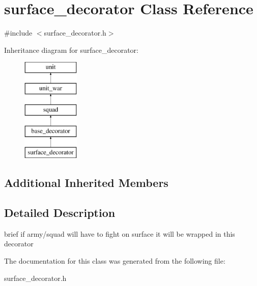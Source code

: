\hypertarget{classsurface__decorator}{}\section{surface\+\_\+decorator Class Reference}
\label{classsurface__decorator}


{\ttfamily \#include $<$surface\+\_\+decorator.\+h$>$}

Inheritance diagram for surface\+\_\+decorator\+:\begin{figure}[H]
\begin{center}
\leavevmode
\includegraphics[height=5.000000cm]{classsurface__decorator}
\end{center}
\end{figure}
\subsection*{Additional Inherited Members}


\subsection{Detailed Description}
brief if army/squad will have to fight on surface it will be wrapped in this decorator 

The documentation for this class was generated from the following file\+:\begin{DoxyCompactItemize}
\item 
surface\+\_\+decorator.\+h\end{DoxyCompactItemize}
